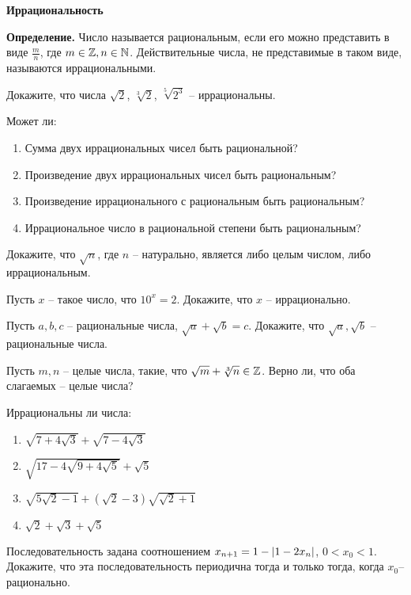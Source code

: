 \documentclass{article}
\begin{document}
    \large


    \begin{center}
        \textbf{Иррациональность}
    \end{center}

    \textbf{Определение.}
    Число называется рациональным, если его можно представить в виде $\frac{m}{n}$, где $m \in \mathbb{Z}, n \in \mathbb{N}$.
    Действительные числа, не представимые в таком виде, называются иррациональными.
    \begin{enumerate_boxed}

        \item Докажите, что числа $\sqrt{2}$, $\sqrt[3]{2}$, $\sqrt[5]{2^3}$ – иррациональны.

        \item Может ли:
        \begin{enumerate}
            \item Сумма двух иррациональных чисел быть рациональной?
            \item Произведение двух иррациональных чисел быть рациональным?
            \item Произведение иррационального с рациональным быть рациональным?
            \item Иррациональное число в рациональной степени быть рациональным?
        \end{enumerate}

        \item Докажите, что $\sqrt{n}$, где $n$ – натурально, является либо целым числом, либо иррациональным.

        \item Пусть $x$ – такое число, что $10^x = 2.$ Докажите, что $x$ – иррационально.

        \item Пусть $a, b, c$ – рациональные числа, $\sqrt{a} + \sqrt{b} = c$.
        Докажите, что $\sqrt{a}, \sqrt{b}$ – рациональные числа.

        \item Пусть $m, n$ – целые числа, такие, что $\sqrt{m} + \sqrt[3]{n} \in \mathbb{Z}$.
        Верно ли, что оба слагаемых – целые числа?

        \item Иррациональны ли числа:
        \begin{enumerate}
            \item $\sqrt{7 + 4\sqrt{3}} + \sqrt{7 - 4\sqrt{3}}$
            \item $\sqrt{17 - 4\sqrt{9 + 4\sqrt{5}}} + \sqrt{5}$
            \item $\sqrt{5\sqrt{2} - 1} + \left(\sqrt{2} - 3\right)\sqrt{\sqrt{2} + 1}$
            \item $\sqrt{2} + \sqrt{3} + \sqrt{5}$
        \end{enumerate}

        \item Последовательность задана соотношением $x_{n + 1} = 1 - \lvert1 - 2x_{n}\rvert$, $0 < x_0 < 1$.
        Докажите, что эта последовательность периодична тогда и только тогда, когда $x_0$– рационально.

    \end{enumerate_boxed}
\end{document}
